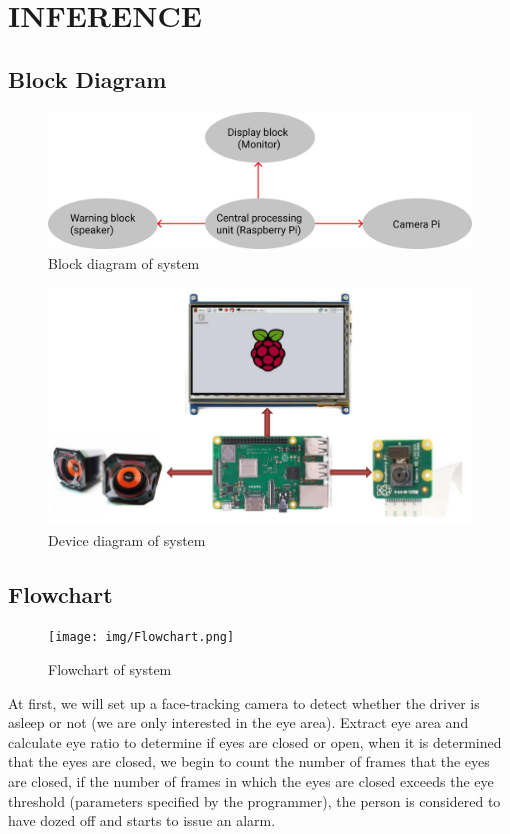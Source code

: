\chapter{INFERENCE}

\renewcommand{\headrulewidth}{0.5pt}
\renewcommand{\footrulewidth}{0.5pt}
\thispagestyle{plain}
\pagestyle{fancy}
\fancyhf{}
\raggedright
{}

\justifying

\section{Block Diagram}
    \begin{figure}[H]
        \centering
        \includegraphics[width=0.6\linewidth]{img/block-diagram.png}
        \caption{Block diagram of system}
    \end{figure}
    \begin{figure}[H]
        \centering
        \includegraphics[width=0.6\linewidth]{img/Device-diagram.png}
        \caption{Device diagram of system}
    \end{figure}

\section{Flowchart}
    \begin{figure}[H]
        \centering
        \texttt{[image: img/Flowchart.png]}
        \caption{Flowchart of system}
    \end{figure}
    At first, we will set up a face-tracking camera to detect whether the driver is asleep or not (we are only interested in the eye area). 
    Extract eye area and calculate eye ratio to determine if eyes are closed or open, when it is determined that the eyes are closed, we 
    begin to count the number of frames that the eyes are closed, if the number of frames in which the eyes are closed exceeds the eye 
    threshold (parameters specified by the programmer), the person is considered to have dozed off and starts to issue an alarm.

